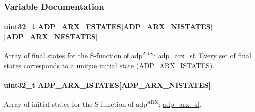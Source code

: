 \subsubsection{\-Variable \-Documentation}
\hypertarget{adp-arx_8hh_af70040b1b46c82f1fbe37b5bab89d7db}{
\paragraph[{\-A\-D\-P\-\_\-\-A\-R\-X\-\_\-\-F\-S\-T\-A\-T\-E\-S}]{\setlength{\rightskip}{0pt plus 5cm}uint32\-\_\-t {\bf \-A\-D\-P\-\_\-\-A\-R\-X\-\_\-\-F\-S\-T\-A\-T\-E\-S}\mbox{[}{\bf \-A\-D\-P\-\_\-\-A\-R\-X\-\_\-\-N\-I\-S\-T\-A\-T\-E\-S}\mbox{]}\mbox{[}{\bf \-A\-D\-P\-\_\-\-A\-R\-X\-\_\-\-N\-F\-S\-T\-A\-T\-E\-S}\mbox{]}}}\label{adp-arx_8hh_af70040b1b46c82f1fbe37b5bab89d7db}
\-Array of final states for the \-S-\/function of $\mathrm{adp}^{\mathrm{ARX}}$\-: \hyperlink{adp-arx_8hh_afa557fabb780c1febded3e85fe3c7510}{adp\-\_\-arx\-\_\-sf}. \-Every set of final states corresponds to a unique initial state (\hyperlink{adp-arx_8hh_a94f941841e2bc961bc9abd1c7e0b8513}{\-A\-D\-P\-\_\-\-A\-R\-X\-\_\-\-I\-S\-T\-A\-T\-E\-S}). \hypertarget{adp-arx_8hh_a94f941841e2bc961bc9abd1c7e0b8513}{
\paragraph[{\-A\-D\-P\-\_\-\-A\-R\-X\-\_\-\-I\-S\-T\-A\-T\-E\-S}]{\setlength{\rightskip}{0pt plus 5cm}uint32\-\_\-t {\bf \-A\-D\-P\-\_\-\-A\-R\-X\-\_\-\-I\-S\-T\-A\-T\-E\-S}\mbox{[}{\bf \-A\-D\-P\-\_\-\-A\-R\-X\-\_\-\-N\-I\-S\-T\-A\-T\-E\-S}\mbox{]}}}\label{adp-arx_8hh_a94f941841e2bc961bc9abd1c7e0b8513}
\-Array of initial states for the \-S-\/function of $\mathrm{adp}^{\mathrm{ARX}}$\-: \hyperlink{adp-arx_8hh_afa557fabb780c1febded3e85fe3c7510}{adp\-\_\-arx\-\_\-sf}. 